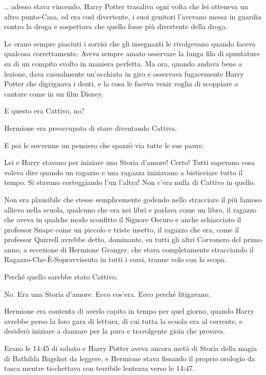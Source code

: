 … adesso stava vincendo, Harry Potter trasaliva ogni volta che lei otteneva un altro punto-Casa, ed era così divertente, i suoi genitori l’avevano messa in guardia contro la droga e sospettava che quello fosse più divertente della droga.

Le erano sempre piaciuti i sorrisi che gli insegnanti le rivolgevano quando faceva qualcosa correttamente. Aveva sempre amato osservare la lunga fila di spuntature su di un compito svolto in maniera perfetta. Ma ora, quando andava bene a lezione, dava casualmente un’occhiata in giro e osservava fugacemente Harry Potter che digrignava i denti, e la cosa le faceva venir voglia di scoppiare a cantare come in un film Disney.

E questo era Cattivo, no?

Hermione era preoccupata di stare diventando Cattiva.

E poi le sovvenne un pensiero che spazzò via tutte le sue paure.

Lei e Harry stavano per iniziare una Storia d’amore! Certo! Tutti sapevano cosa voleva dire quando un ragazzo e una ragazza iniziavano a bisticciare tutto il tempo. Si stavano corteggiando l’un l’altra! Non c’era nulla di Cattivo in quello.

Non era plausibile che stesse semplicemente godendo nello stracciare il più famoso allievo nella scuola, qualcuno che era nei libri e parlava come un libro, il ragazzo che aveva in qualche modo sconfitto il Signore Oscuro e anche schiacciato il professor Snape come un piccolo e triste insetto, il ragazzo che era, come il professor Quirrell avrebbe detto, dominante, su tutti gli altri Corvonero del primo anno, a eccezione di Hermione Granger, che stava completamente stracciando il Ragazzo-Che-È-Sopravvissuto in tutti i corsi, tranne volo con la scopa.

Perché quello sarebbe stato Cattivo.

No. Era una Storia d’amore. Ecco cos’era. Ecco perché litigavano.

Hermione era contenta di averlo capito in tempo per quel giorno, quando Harry avrebbe perso la loro gara di lettura, di cui tutta la scuola era al corrente, e desiderò iniziare a danzare per la pura e travolgente gioia che provava.

Erano le 14:45 di sabato e Harry Potter aveva ancora metà di Storia della magia di Bathilda Bagshot da leggere, e Hermione stava fissando il proprio orologio da tasca mentre ticchettava con terribile lentezza verso le 14:47.


